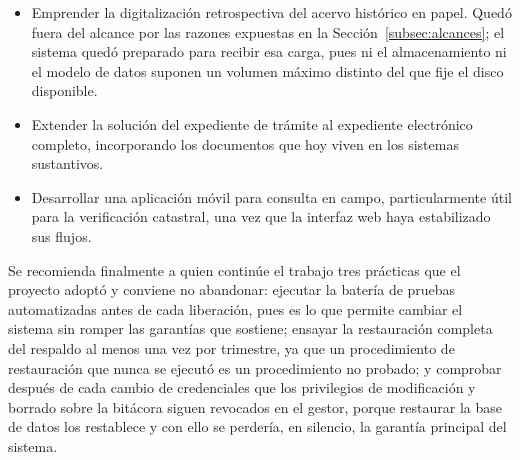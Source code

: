 \begin{description}[leftmargin=0pt,font=\bfseries,itemsep=0.55em,parsep=0pt]
  \item[Largo plazo (más de un año).]\leavevmode
  \begin{itemize}[nosep,leftmargin=1.4em,topsep=1pt]
    \item Emprender la digitalización retrospectiva del acervo histórico en papel. Quedó fuera del alcance por las razones expuestas en la Sección~\ref{subsec:alcances}; el sistema quedó preparado para recibir esa carga, pues ni el almacenamiento ni el modelo de datos suponen un volumen máximo distinto del que fije el disco disponible.
    \item Extender la solución del expediente de trámite al expediente electrónico completo, incorporando los documentos que hoy viven en los sistemas sustantivos.
    \item Desarrollar una aplicación móvil para consulta en campo, particularmente útil para la verificación catastral, una vez que la interfaz web haya estabilizado sus flujos.
  \end{itemize}
\end{description}

Se recomienda finalmente a quien continúe el trabajo tres prácticas que el proyecto adoptó y conviene no abandonar: ejecutar la batería de pruebas automatizadas antes de cada liberación, pues es lo que permite cambiar el sistema sin romper las garantías que sostiene; ensayar la restauración completa del respaldo al menos una vez por trimestre, ya que un procedimiento de restauración que nunca se ejecutó es un procedimiento no probado; y comprobar después de cada cambio de credenciales que los privilegios de modificación y borrado sobre la bitácora siguen revocados en el gestor, porque restaurar la base de datos los restablece y con ello se perdería, en silencio, la garantía principal del sistema.

